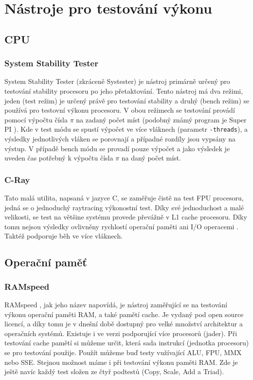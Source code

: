\section{Nástroje pro testování výkonu}
\subsection{CPU}
\subsubsection{System Stability Tester \cite{cpu:systester}}
System Stability Tester (zkráceně Systester) je nástroj primárně určený pro testování stability procesoru po jeho přetaktování. Tento nástroj má dva režimi, jeden (test režim) je určený právě pro testování stability a druhý (bench režim) se používá pro testovní výkonu procesoru. V obou režimech se testování provádí pomocí výpočtu čísla $\pi$ na zadaný počet míst (podobný známý program je Super PI \cite{cpu:superpi}). Kde v test módu se spustí výpočet ve více vláknech (parametr \texttt{-threads}), a výsledky jednotlivých vláken se porovnají a případné rozdíly jsou vypsány na výstup. V případě bench módu se provadí pouze výpočet a jako výsledek je uveden čas potřebný k výpočtu čísla $\pi$ na daný počet míst.

\subsubsection{C-Ray}
Tato malá utilita, napsaná v jazyce C, se zaměřuje čistě na test FPU procesoru, jedná se o jednoduchý raytracing výkonostní test. Díky své jednoduchost a malé velikosti, se test na většine systému provede převážně v L1 cache procesoru. Díky tomu nejsou výsledky ovlivněny rychlostí operační paměti ani I/O operacemi \cite{cpu:cray}. Taktéž podporuje běh ve více vláknech.
\subsection{Operační paměť}
\subsubsection{RAMspeed}
RAMspeed \cite{ram:ramspeed}, jak jeho název napovídá, je nástroj zaměřující se na testování výkonu operační paměti RAM, a také pamětí cache. Je vydaný pod open source licencí, a díky tomu je v dnešní době dostupný pro velké množství architektur a operačních systémů. Existuje i ve verzi podporující více procesorů (jader). Při testování cache pamětí si můžeme určit, která sada instrukcí (jednotka procesoru) se pro testování použije. Použít můžeme buď testy vužívající ALU, FPU, MMX nebo SSE. Stejnou možnost máme i při testování výkonu paměti RAM. Zde je ještě navíc každý test složen ze čtyř podtestů (Copy, Scale, Add a Triad).
